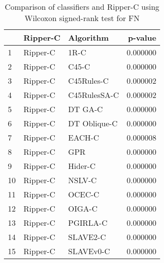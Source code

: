 \begin{table}
\footnotesize
\caption{Comparison of classifiers and Ripper-C using Wilcoxon signed-rank test for FN}
\label{tab:Ripper-C wilcoxon FN comparison}
\begin{tabular}{lllr}
\hline
 & Ripper-C & Algorithm & p-value \\
\hline
1 & Ripper-C & 1R-C & 0.000000 \\
2 & Ripper-C & C45-C & 0.000000 \\
3 & Ripper-C & C45Rules-C & 0.000002 \\
4 & Ripper-C & C45RulesSA-C & 0.000002 \\
5 & Ripper-C & DT GA-C & 0.000000 \\
6 & Ripper-C & DT Oblique-C & 0.000000 \\
7 & Ripper-C & EACH-C & 0.000008 \\
8 & Ripper-C & GPR & 0.000000 \\
9 & Ripper-C & Hider-C & 0.000000 \\
10 & Ripper-C & NSLV-C & 0.000000 \\
11 & Ripper-C & OCEC-C & 0.000000 \\
12 & Ripper-C & OIGA-C & 0.000000 \\
13 & Ripper-C & PGIRLA-C & 0.000000 \\
14 & Ripper-C & SLAVE2-C & 0.000000 \\
15 & Ripper-C & SLAVEv0-C & 0.000000 \\
\hline
\end{tabular}
\end{table}
